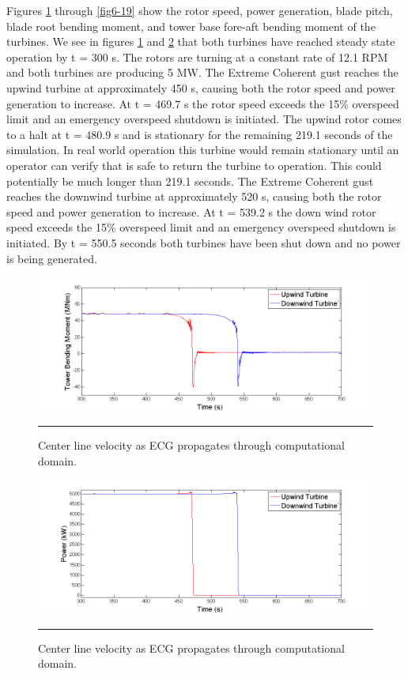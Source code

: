 Figures \ref{fig6-15} through \ref{fig6-19} show the rotor speed, power generation, blade pitch, blade root bending moment, and tower base fore-aft bending moment of the turbines. We see in figures \ref{fig6-15} and \ref{fig6-16} that both turbines have reached steady state operation by t = 300 s. The rotors are turning at a constant rate of 12.1 RPM and both turbines are producing 5 MW. The Extreme Coherent gust reaches the upwind turbine at approximately 450 s, causing both the rotor speed and power generation to increase. At t = 469.7 s the rotor speed exceeds the 15\% overspeed limit and an emergency overspeed shutdown is initiated. The upwind rotor comes to a halt at t = 480.9 s and is stationary for the remaining 219.1 seconds of the simulation. In real world operation this turbine would remain stationary until an operator can verify that is safe to return the turbine to operation. This could potentially be much longer than 219.1 seconds. The Extreme Coherent gust reaches the downwind turbine at approximately 520 s, causing both the rotor speed and power generation to increase. At t = 539.2 s the down wind rotor speed exceeds the 15\% overspeed limit and an emergency overspeed shutdown is initiated. By t = 550.5 seconds both turbines have been shut down and no power is being generated.

\begin{figure}[htbp] \label{fig6-15}
	\centering
		\includegraphics[trim = {1cm 0 2cm 0}, clip, width = \linewidth]{Figures/ch6Figures/fig6-15.png}
		\rule{35em}{0.5pt}
	\caption{Center line velocity as ECG propagates through computational domain.}
\end{figure}
\begin{figure}[htbp] \label{fig6-16}
	\centering
		\includegraphics[trim = {1cm 0 2cm 0}, clip, width = \linewidth]{Figures/ch6Figures/fig6-16.png}
		\rule{35em}{0.5pt}
	\caption{Center line velocity as ECG propagates through computational domain.}
\end{figure}

